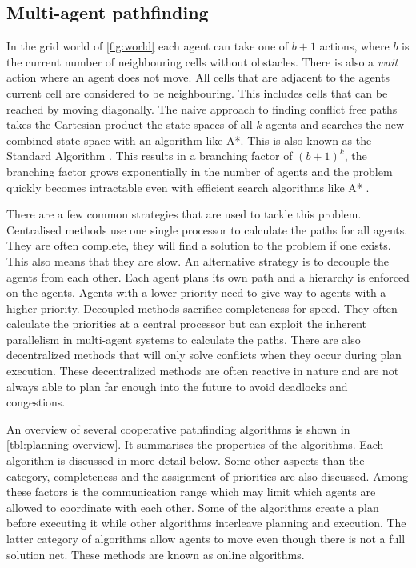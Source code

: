 \subsection{Multi-agent pathfinding}
In the grid world of \autoref{fig:world} each agent can take one of $b+1$
actions, where $b$ is the current number of neighbouring cells without
obstacles. There is also a \textit{wait} action
where an agent does not move. All cells that are adjacent to the agents current
cell are considered to be neighbouring. This includes cells that can be reached
by moving diagonally. The naive approach to finding conflict free paths takes
the Cartesian product the state spaces of all $k$ agents and searches the new
combined state space with an algorithm like A*. This is also known as the
Standard Algorithm \cite{standley2010}. This results in a branching factor of
$(b+1)^k$, the branching factor grows exponentially in the number of agents and
the problem quickly becomes intractable even with efficient search algorithms
like A* \cite{sharon2013}.

There are a few common strategies that are used to tackle this problem.
Centralised methods use one single processor to calculate the paths for all
agents. They are often complete, they will find a solution to the problem if
one exists. This also means that they are slow. An alternative strategy is to
decouple the agents from each other. Each agent plans its own path and a
hierarchy is enforced on the agents. Agents with a lower priority need
to give way to agents with a higher priority. Decoupled methods sacrifice
completeness for speed. They often calculate the priorities at a central
processor but can exploit the inherent parallelism in multi-agent systems to
calculate the paths. There are also decentralized methods that will only solve
conflicts when they occur during plan execution. These decentralized methods
are often reactive in nature and are not always able to plan far enough into
the future to avoid deadlocks and congestions.

An overview of several cooperative pathfinding algorithms is shown in
\autoref{tbl:planning-overview}. It summarises the properties of the
algorithms. Each algorithm is discussed in more detail below. Some other
aspects than the category, completeness and the assignment of priorities are
also discussed. Among these factors is the communication range which may limit
which agents are allowed to coordinate with each other. Some of the algorithms
create a plan before executing it while other algorithms interleave planning
and execution. The latter category of algorithms allow agents to move even
though there is not a full solution net. These methods are known as online
algorithms.

